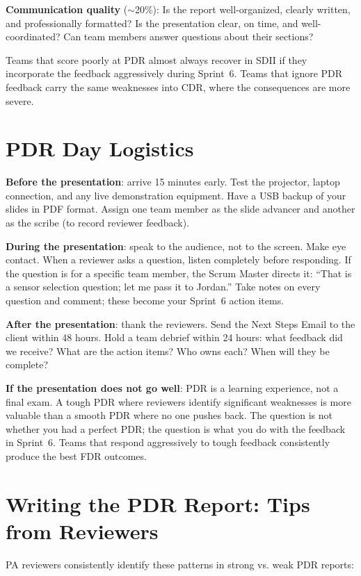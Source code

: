 \textbf{Communication quality} ($\sim$20\%): Is the report well-organized, clearly written, and professionally formatted? Is the presentation clear, on time, and well-coordinated? Can team members answer questions about their sections?

Teams that score poorly at PDR almost always recover in SDII if they incorporate the feedback aggressively during Sprint~6. Teams that ignore PDR feedback carry the same weaknesses into CDR, where the consequences are more severe.



\section{PDR Day Logistics}
\textbf{Before the presentation}: arrive 15 minutes early. Test the projector, laptop connection, and any live demonstration equipment. Have a USB backup of your slides in PDF format. Assign one team member as the slide advancer and another as the scribe (to record reviewer feedback).

\textbf{During the presentation}: speak to the audience, not to the screen. Make eye contact. When a reviewer asks a question, listen completely before responding. If the question is for a specific team member, the Scrum Master directs it: ``That is a sensor selection question; let me pass it to Jordan.'' Take notes on every question and comment; these become your Sprint~6 action items.

\textbf{After the presentation}: thank the reviewers. Send the Next Steps Email to the client within 48 hours. Hold a team debrief within 24 hours: what feedback did we receive? What are the action items? Who owns each? When will they be complete?

\textbf{If the presentation does not go well}: PDR is a learning experience, not a final exam. A tough PDR where reviewers identify significant weaknesses is more valuable than a smooth PDR where no one pushes back. The question is not whether you had a perfect PDR; the question is what you do with the feedback in Sprint~6. Teams that respond aggressively to tough feedback consistently produce the best FDR outcomes.



\section{Writing the PDR Report: Tips from Reviewers}
PA reviewers consistently identify these patterns in strong vs. weak PDR reports:

